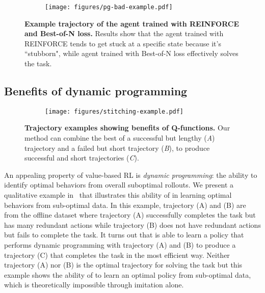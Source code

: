 \begin{figure}[!t]
     \centering
    \begin{subfigure}[b]{0.85\textwidth}
         \centering
    \texttt{[image: figures/pg-bad-example.pdf]}
     \end{subfigure}
        \caption{\footnotesize{\textbf{Example trajectory of the agent trained with REINFORCE and Best-of-N loss.} Results show that the agent trained with REINFORCE tends to get stuck at a specific state because it's ``stubborn", while agent trained with Best-of-N loss effectively solves the task.}}
        \label{fig:pg-example}
        \vspace{2mm}
\end{figure}

\subsection{Benefits of dynamic programming} \label{app:dyn-prog}

\begin{figure}[t]
     \centering
    \begin{subfigure}[b]{0.85\textwidth}
         \centering
    \texttt{[image: figures/stitching-example.pdf]}
     \end{subfigure}
        \caption{\footnotesize{\textbf{Trajectory examples showing benefits of Q-functions.} Our method can combine the best of a successful but lengthy (\textit{A}) trajectory and a failed but short trajectory (\textit{B}), to produce successful and short trajectories (\textit{C}).}}
        \label{fig:stitching-example}
\end{figure}

An appealing property of value-based RL is \emph{dynamic programming}: the ability to identify optimal behaviors from overall suboptimal rollouts. We present a qualitative example in~ that illustrates this ability of \ourmethod{} in learning optimal behaviors from sub-optimal data. 
In this example, trajectory (A) and (B) are from the offline dataset where trajectory (A) successfully completes the task but has many redundant actions while trajectory (B) does not have redundant actions but fails to complete the task. It turns out that \ourmethod{} is able to learn a policy that performs dynamic programming with trajectory (A) and (B) to produce a trajectory (C) that completes the task in the most efficient way. Neither trajectory (A) nor (B) is the optimal trajectory for solving the task but this example shows the ability of \ourmethod{} to learn an optimal policy from sub-optimal data, which is theoretically impossible through imitation alone.
